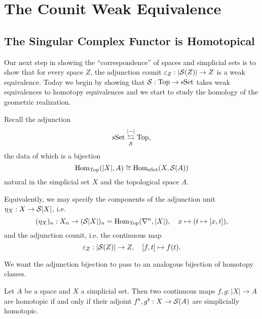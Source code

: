 
\section{The Counit Weak Equivalence}


\subsection{The Singular Complex Functor is Homotopical}

Our next step in showing the \enquote{correspondence} of spaces and simplicial sets is to show that for every space $Z$, the adjunction counit $\epsilon_Z:|\S(Z)|\to Z$ is a weak equivalence. Today we begin by showing that $\S:\Top\to\sSet$ takes weak equivalences to homotopy equivalences and we start to study the homology of the geometric realization.

Recall the adjunction
\[
\sSet\underset{\S}{\overset{|-|}{\leftrightarrows}}\Top,
\]
the data of which is a bijection
\[\Hom_\Top(|X|,A)\cong\Hom_\sSet(X,\S(A))\]
natural in the simplicial set $X$ and the topological space $A$.

Equivalently, we may specify the components of the adjunction unit $\eta_X:X\to\S|X|$, i.e. \[(\eta_X)_n:X_n\to(\S|X|)_n=\Hom_\Top(\ns,|X|),\quad x\mapsto(t\mapsto[x,t]),\]
and the adjunction counit, i.e. the continuous map \[\epsilon_Z:|\S(Z)|\to Z,\quad [f,t]\mapsto f(t).\]

We want the adjunction bijection to pass to an analogous bijection of homotopy classes.

\begin{proposition}\label{proposition:adjunction-preserves-homotopy}
Let $A$ be a space and $X$ a simplicial set. Then two continuous maps $f,g:|X|\to A$ are homotopic if and only if their adjoint $f^\flat,g^\flat:X\to\S(A)$ are simplicially homotopic.
\end{proposition}

